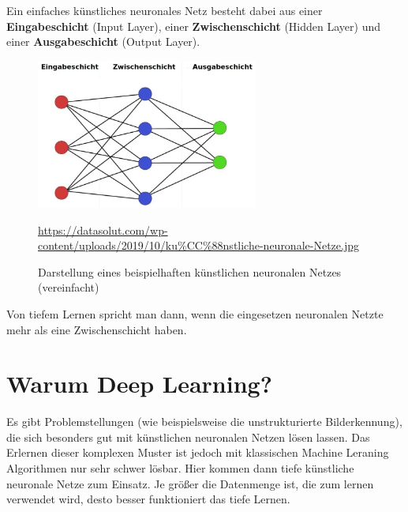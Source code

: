 Ein einfaches künstliches neuronales Netz besteht dabei aus einer \textbf{Eingabeschicht} (Input Layer), einer \textbf{Zwischenschicht} (Hidden Layer) und einer \textbf{Ausgabeschicht} (Output Layer). \cite{datasolut2}

\begin{figure}[H]
	\centering
	\includegraphics[width=0.65\textwidth]{kapitel3/images/Simples_Neuronales_Netz.jpg}
	\caption{Darstellung eines beispielhaften künstlichen neuronalen Netzes \\ (vereinfacht)}
	\label{fig:simples-neuronales-netz}
	\vspace{0.2cm}
	\quelle\url{https://datasolut.com/wp-content/uploads/2019/10/ku%CC%88nstliche-neuronale-Netze.jpg}
\end{figure}

Von tiefem Lernen spricht man dann, wenn die eingesetzen neuronalen Netzte mehr als eine Zwischenschicht haben.  \cite{datasolut2} 

\section{Warum Deep Learning?}

Es gibt Problemstellungen (wie beispielsweise die unstrukturierte Bilderkennung), die sich besonders gut mit künstlichen neuronalen Netzen lösen lassen. Das Erlernen dieser komplexen Muster ist jedoch mit klassischen Machine Leraning Algorithmen nur sehr schwer lösbar. Hier kommen dann tiefe künstliche neuronale Netze zum Einsatz. Je größer die Datenmenge ist, die zum lernen verwendet wird, desto besser funktioniert das tiefe Lernen. \cite{datasolut2}

